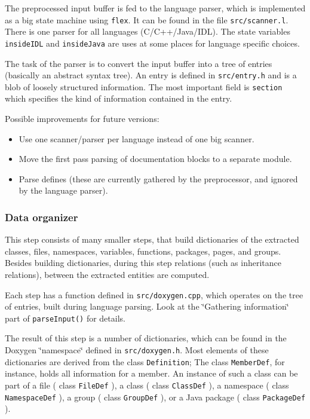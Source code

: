 The preprocessed input buffer is fed to the language parser, which is implemented as a big state machine using {\tt flex}. It can be found in the file {\tt src/scanner.l}. There is one parser for all languages (C/C++/Java/IDL). The state variables {\tt insideIDL} and {\tt insideJava} are uses at some places for language specific choices.

The task of the parser is to convert the input buffer into a tree of entries (basically an abstract syntax tree). An entry is defined in {\tt src/entry.h} and is a blob of loosely structured information. The most important field is {\tt section} which specifies the kind of information contained in the entry.

Possible improvements for future versions:\begin{itemize}
\item Use one scanner/parser per language instead of one big scanner.\item Move the first pass parsing of documentation blocks to a separate module.\item Parse defines (these are currently gathered by the preprocessor, and ignored by the language parser).\end{itemize}


\subsubsection*{Data organizer}

This step consists of many smaller steps, that build dictionaries of the extracted classes, files, namespaces, variables, functions, packages, pages, and groups. Besides building dictionaries, during this step relations (such as inheritance relations), between the extracted entities are computed.

Each step has a function defined in {\tt src/doxygen.cpp}, which operates on the tree of entries, built during language parsing. Look at the \char`\"{}Gathering information\char`\"{} part of {\tt parseInput()} for details.

The result of this step is a number of dictionaries, which can be found in the Doxygen \char`\"{}namespace\char`\"{} defined in {\tt src/doxygen.h}. Most elements of these dictionaries are derived from the class {\tt Definition}; The class {\tt MemberDef}, for instance, holds all information for a member. An instance of such a class can be part of a file ( class {\tt FileDef} ), a class ( class {\tt ClassDef} ), a namespace ( class {\tt NamespaceDef} ), a group ( class {\tt GroupDef} ), or a Java package ( class {\tt PackageDef} ).

